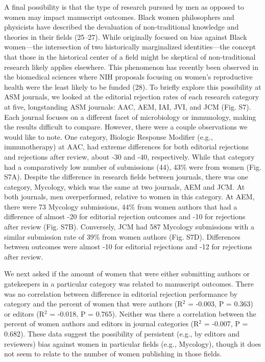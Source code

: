 \documentclass[11pt,]{article}
\begin{document}
A final possibility is that the type of research pursued by men as
opposed to women may impact manuscript outcomes. Black women
philosophers and physicists have described the devaluation of
non-traditional knowledge and theories in their fields (25--27). While
originally focused on bias against Black women---the intersection of two
historically marginalized identities---the concept that those in the
historical center of a field might be skeptical of non-traditional
research likely applies elsewhere. This phenomenon has recently been
observed in the biomedical sciences where NIH proposals focusing on
women's reproductive health were the least likely to be funded (28). To
briefly explore this possibility at ASM journals, we looked at the
editorial rejection rates of each research category at five,
longstanding ASM journals: AAC, AEM, IAI, JVI, and JCM (Fig. S7). Each
journal focuses on a different facet of microbiology or immunology,
making the results difficult to compare. However, there were a couple
observations we would like to note. One category, Biologic Response
Modifier (e.g., immunotherapy) at AAC, had extreme differences for both
editorial rejections and rejections after review, about -30 and -40,
respectively. While that category had a comparatively low number of
submissions (44), 43\% were from women (Fig. S7A). Despite the
difference in research fields between journals, there was one category,
Mycology, which was the same at two journals, AEM and JCM. At both
journals, men overperformed, relative to women in this category. At AEM,
there were 73 Mycology submissions, 44\% from women authors that had a
difference of almost -20 for editorial rejection outcomes and -10 for
rejections after review (Fig. S7B). Conversely, JCM had 587 Mycology
submissions with a similar submission rate of 39\% from women authors
(Fig. S7D). Differences between outcomes were almost -10 for editorial
rejections and -12 for rejections after review.

We next asked if the amount of women that were either submitting authors
or gatekeepers in a particular category was related to manuscript
outcomes. There was no correlation between difference in editorial
rejection performance by category and the percent of women that were
authors (R\({^2}\) = -0.003, P = 0.363) or editors (R\({^2}\) = -0.018,
P = 0.765). Neither was there a correlation between the percent of women
authors and editors in journal categories (R\({^2}\) = -0.007, P =
0.682). These data suggest the possibility of persistent (e.g., by
editors and reviewers) bias against women in particular fields (e.g.,
Mycology), though it does not seem to relate to the number of women
publishing in those fields.
\end{document}
